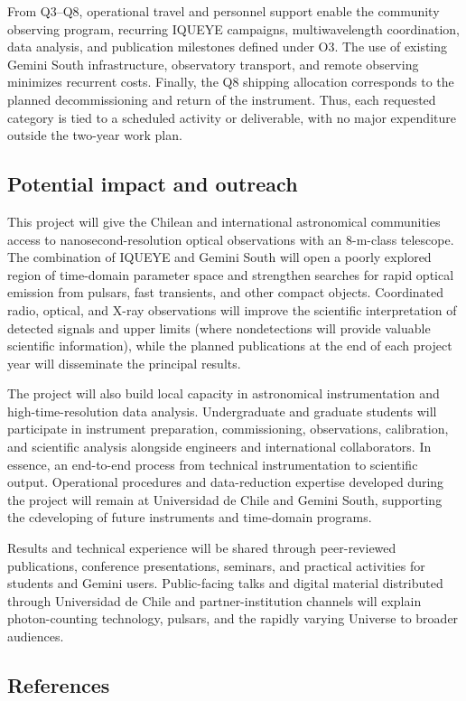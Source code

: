 \documentclass[
    11pt,
    a4paper,
    ]{article}
\begin{document}
From Q3--Q8, operational travel and personnel support enable the community observing program, recurring IQUEYE campaigns, multiwavelength coordination, data analysis, and publication milestones defined under O3. The use of existing Gemini South infrastructure, observatory transport, and remote observing minimizes recurrent costs. Finally, the Q8 shipping allocation corresponds to the planned decommissioning and return of the instrument. Thus, each requested category is tied to a scheduled activity or deliverable, with no major expenditure outside the two-year work plan.

\subsection{Potential impact and outreach}

This project will give the Chilean and international astronomical communities access to nanosecond-resolution optical observations with an 8-m-class telescope. The combination of IQUEYE and Gemini South will open a poorly explored region of time-domain parameter space and strengthen searches for rapid optical emission from pulsars, fast transients, and other compact objects. Coordinated radio, optical, and X-ray observations will improve the scientific interpretation of detected signals and upper limits (where nondetections will provide valuable scientific information), while the planned publications at the end of each project year will disseminate the principal results.

The project will also build local capacity in astronomical instrumentation and high-time-resolution data analysis. Undergraduate and graduate students will participate in instrument preparation, commissioning, observations, calibration, and scientific analysis alongside engineers and international collaborators. In essence, an end-to-end process from technical instrumentation to scientific output. 
Operational procedures and data-reduction expertise developed during the project will remain at Universidad de Chile and Gemini South, supporting the cdeveloping of future instruments and time-domain programs.

Results and technical experience will be shared through peer-reviewed publications, conference presentations, seminars, and practical activities for students and Gemini users. Public-facing talks and digital material distributed through Universidad de Chile and partner-institution channels will explain photon-counting technology, pulsars, and the rapidly varying Universe to broader audiences.

\subsection*{References}

\printbibliography[
  heading=none,
  ]
\end{document}
